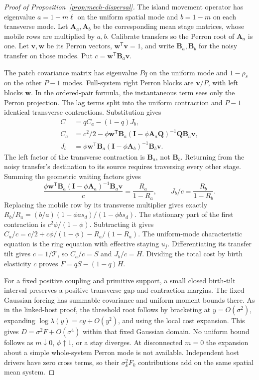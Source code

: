 \begin{proof}[Proof of Proposition~\ref{prop:mech-dispersal}]
The island movement operator has eigenvalue \(a=1-m\ell\) on the uniform spatial mode and \(b=1-m\) on each transverse mode. Let \(\mathbf A_a,\mathbf A_b\) be the corresponding mean stage matrices, whose mobile rows are multiplied by \(a,b\). Calibrate transfers so the Perron root of \(\mathbf A_a\) is one. Let \(\mathbf v,\mathbf w\) be its Perron vectors, \(\mathbf w^{\mathsf T}\mathbf v=1\), and write \(\mathbf B_a,\mathbf B_b\) for the noisy transfer on those modes. Put \(c=\mathbf w^{\mathsf T}\mathbf B_a\mathbf v\).

The patch covariance matrix has eigenvalue \(Pq\) on the uniform mode and \(1-\rho_s\) on the other \(P-1\) modes. Full-system right Perron blocks are \(\mathbf v/P\), with left blocks \(\mathbf w\). In the ordered-pair formula, the instantaneous term sees only the Perron projection. The lag terms split into the uniform contraction and \(P-1\) identical transverse contractions. Substitution gives
\begin{align*}
 C&=qC_a-(1-q)J_b,\\
 C_a&=c^2/2-\phi\mathbf w^{\mathsf T}\mathbf B_a
 (\mathbf I-\phi\mathbf A_a\mathbf Q)^{-1}\mathbf Q\mathbf B_a\mathbf v,\\
 J_b&=\phi\mathbf w^{\mathsf T}\mathbf B_a
 (\mathbf I-\phi\mathbf A_b)^{-1}\mathbf B_b\mathbf v.
\end{align*}
The left factor of the transverse contraction is \(\mathbf B_a\), not \(\mathbf B_b\). Returning from the noisy transfer's destination to its source requires traversing every other stage. Summing the geometric waiting factors gives
\[
 \frac{\phi\mathbf w^{\mathsf T}\mathbf B_a(\mathbf I-\phi\mathbf A_a)^{-1}
 \mathbf B_a\mathbf v}{c}=\frac{R_a}{1-R_a},\qquad
 J_b/c=\frac{R_b}{1-R_b}.
\]
Replacing the mobile row by its transverse multiplier gives exactly
\(R_b/R_a=(b/a)(1-\phi as_d)/(1-\phi bs_d)\).
The stationary part of the first contraction is \(c^2\phi/(1-\phi)\). Subtracting it gives
\(C_a/c=c/2+c\phi/(1-\phi)-R_a/(1-R_a)\).
The uniform-mode characteristic equation is the ring equation with effective staying \(u_j\). Differentiating its transfer tilt gives \(c=1/\mathcal T\), so \(C_a/c=S\) and \(J_b/c=H\). Dividing the total cost by birth elasticity \(c\) proves \(F=qS-(1-q)H\).

For a fixed positive coupling and primitive support, a small closed birth-tilt interval preserves a positive transverse gap and contraction margins. The fixed Gaussian forcing has summable covariance and uniform moment bounds there. As in the linked-host proof, the threshold root follows by bracketing at \(y=O(\sigma^2)\), expanding \(\log\lambda(y)=cy+O(y^2)\), and using the local cost expansion. This gives \(D=\sigma^2F+O(\sigma^4)\) within that fixed Gaussian domain. No uniform bound follows as \(m\downarrow0\), \(\phi\uparrow1\), or a stay diverges. At disconnected \(m=0\) the expansion about a simple whole-system Perron mode is not available. Independent host drivers have zero cross terms, so their \(\sigma_k^2F_k\) contributions add on the same spatial mean system.
\end{proof}

